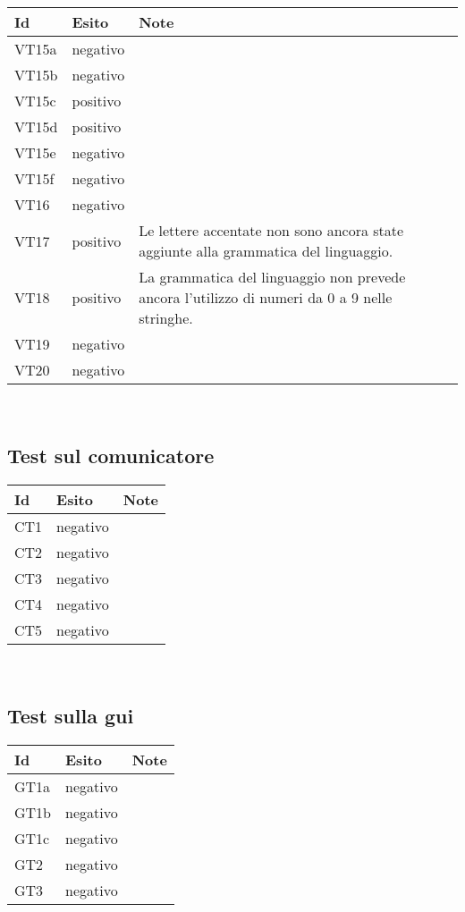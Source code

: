 \begin{center}
\begin{tabular}{|p{1cm}|p{1.6cm}|p{8.4cm}|} \hline
\textbf{Id} & \textbf{Esito} & \textbf{Note} \\ \hline
VT15a & negativo & \\ \hline
VT15b & negativo & \\ \hline
VT15c & \textcolor{err}{positivo} & \\ \hline
VT15d & \textcolor{err}{positivo} & \\ \hline
VT15e & negativo & \\ \hline
VT15f & negativo & \\ \hline
VT16 & negativo & \\ \hline
VT17 & \textcolor{err}{positivo} & Le lettere accentate non sono ancora state aggiunte alla grammatica del linguaggio.\\ \hline
VT18 & \textcolor{err}{positivo} & La grammatica del linguaggio non prevede ancora l'utilizzo di numeri da 0 a 9 nelle stringhe.\\ \hline
VT19 & negativo & \\ \hline
VT20 & negativo & \\ \hline
\end{tabular} \\
\end{center}

\subsection{Test sul comunicatore}
\begin{center}
\begin{tabular}{|p{1cm}|p{1.6cm}|p{8.4cm}|} \hline
\textbf{Id} & \textbf{Esito} & \textbf{Note} \\ \hline
CT1 & negativo & \\ \hline
CT2 & negativo & \\ \hline
CT3 & negativo & \\ \hline
CT4 & negativo & \\ \hline
CT5 & negativo & \\ \hline
\end{tabular} \\
\end{center}

\subsection{Test sulla gui}
\begin{center}
\begin{tabular}{|p{1cm}|p{1.6cm}|p{8.4cm}|} \hline
\textbf{Id} & \textbf{Esito} & \textbf{Note} \\ \hline
GT1a & negativo & \\ \hline
GT1b & negativo & \\ \hline
GT1c & negativo & \\ \hline
GT2 & negativo & \\ \hline
GT3 & negativo & \\ \hline
\end{tabular} \\
\end{center}

